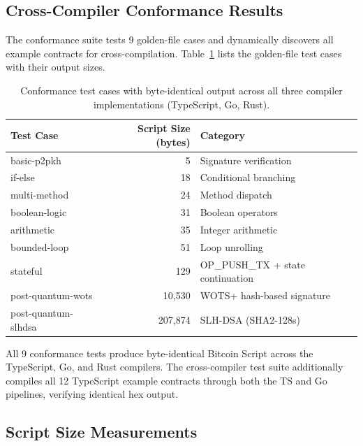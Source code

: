 \documentclass[11pt,a4paper]{article}
\begin{document}
\subsection{Cross-Compiler Conformance Results}
\label{sec:eval-conformance}

The conformance suite tests 9 golden-file cases and dynamically discovers
all example contracts for cross-compilation. Table~\ref{tab:conformance}
lists the golden-file test cases with their output sizes.

\begin{table}[h]
\centering
\small
\begin{tabular}{@{}lrl@{}}
\toprule
\textbf{Test Case} & \textbf{Script Size (bytes)} & \textbf{Category} \\
\midrule
basic-p2pkh & 5 & Signature verification \\
if-else & 18 & Conditional branching \\
multi-method & 24 & Method dispatch \\
boolean-logic & 31 & Boolean operators \\
arithmetic & 35 & Integer arithmetic \\
bounded-loop & 51 & Loop unrolling \\
stateful & 129 & OP\_PUSH\_TX + state continuation \\
post-quantum-wots & 10,530 & WOTS+ hash-based signature \\
post-quantum-slhdsa & 207,874 & SLH-DSA (SHA2-128s) \\
\bottomrule
\end{tabular}
\caption{Conformance test cases with byte-identical output across
  all three compiler implementations (TypeScript, Go, Rust).}
\label{tab:conformance}
\end{table}

All 9 conformance tests produce byte-identical Bitcoin Script across the
TypeScript, Go, and Rust compilers. The cross-compiler test suite additionally
compiles all 12 TypeScript example contracts through both the TS and Go
pipelines, verifying identical hex output.

\subsection{Script Size Measurements}
\label{sec:eval-sizes}
\end{document}
